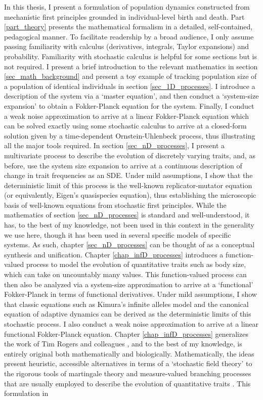 In this thesis, I present a formulation of population dynamics constructed from mechanistic first principles grounded in individual-level birth and death. Part \ref{part_theory} presents the mathematical formalism in a detailed, self-contained, pedagogical manner. To facilitate readership by a broad audience, I only assume passing familiarity with calculus (derivatives, integrals, Taylor expansions) and probability. Familiarity with stochastic calculus is helpful for some sections but is not required. I present a brief introduction to the relevant mathematics in section \ref{sec_math_background} and present a toy example of tracking population size of a population of identical individuals in section \ref{sec_1D_processes}. I introduce a description of the system via a `master equation', and then conduct a `system-size expansion' to obtain a Fokker-Planck equation for the system. Finally, I conduct a weak noise approximation to arrive at a linear Fokker-Planck equation which can be solved exactly using some stochastic calculus to arrive at a closed-form solution given by a time-dependent Ornstein-Uhlenbeck process, thus illustrating all the major tools required. In section \ref{sec_nD_processes}, I present a multivariate process to describe the evolution of discretely varying traits, and, as before, use the system size expansion to arrive at a continuous description of change in trait frequencies as an SDE. Under mild assumptions, I show that the deterministic limit of this process is the well-known replicator-mutator equation (or equivalently, Eigen's quasispecies equation), thus establishing the microscopic basis of well-known equations from stochastic first principles. While the mathematics of section \ref{sec_nD_processes} is standard and well-understood, it has, to the best of my knowledge, not been used in this context in the generality we use here, though it has been used in several specific models of specific systems. As such, chapter \ref{sec_nD_processes} can be thought of as a conceptual synthesis and unification. Chapter \ref{chap_infD_processes} introduces a function-valued process to model the evolution of quantitative traits such as body size, which can take on uncountably many values. This function-valued process can then also be analyzed via a system-size approximation to arrive at a `functional' Fokker-Planck in terms of functional derivatives. Under mild assumptions, I show that classic equations such as Kimura's infinite alleles model and the canonical equation of adaptive dynamics can be derived as the deterministic limits of this stochastic process. I also conduct a weak noise approximation to arrive at a linear functional Fokker-Planck equation. Chapter \ref{chap_infD_processes} generalizes the work of Tim Rogers and colleagues \citep{rogers_demographic_2012,rogers_spontaneous_2012,rogers_modes_2015}, and to the best of my knowledge, is entirely original both mathematically and biologically. Mathematically, the ideas present heuristic, accessible alternatives in terms of a `stochastic field theory' to the rigorous tools of martingale theory and measure-valued branching processes that are usually employed to describe the evolution of quantitative traits \citep{champagnat_unifying_2006,etheridge_mathematical_2011, week_white_2021}. This formulation in 
